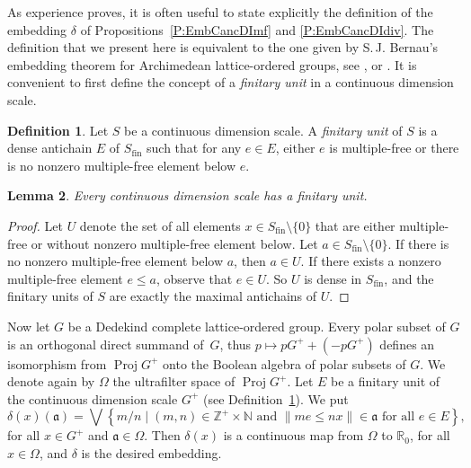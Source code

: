 \documentclass[psamsfonts,reqno]{memo-l}
\theoremstyle{plain}
\newtheorem{lemma}{Lemma}[section]
\theoremstyle{definition}
\newtheorem{definition}[lemma]{Definition}
\theoremstyle{remark}
\numberwithin{equation}{section}
\newcommand{\fa}{\mathfrak{a}}
\newcommand{\fin}{\mathrm{fin}}
\newcommand{\bv}[1]{\left\|#1\right\|}
\newcommand{\NN}{\mathbb{N}}
\newcommand{\ZZ}{\mathbb{Z}}
\newcommand{\RR}{\mathbb{R}}
\DeclareMathOperator{\BB}{Proj}
\newcommand{\set}[1]{\{#1\}}
\newcommand{\Set}[1]{\left\{#1\right\}}
\newcommand{\Setm}[2]{\Set{#1\mid#2}}
\begin{document}
As experience proves, it is often useful to state explicitly the definition
of the embedding $\delta$ of Propositions~\ref{P:EmbCancDImf} and
\ref{P:EmbCancDIdiv}. The definition that we present here is equivalent to
the one given by S.\,J. Bernau's embedding theorem for Archimedean
lattice-ordered groups, see \cite{Bern65}, or
%
\cite[Theorem~2.4]{AnFe88}. It is convenient to first define the concept of a
\emph{finitary unit} in a continuous dimension scale.

\begin{definition}\label{D:FinUn}
Let $S$ be a continuous dimension scale. A \emph{finitary
unit}
of $S$ is a dense
antichain $E$ of $S_\fin$ such that for any $e\in E$, either $e$ is 
multiple-free or there is
no nonzero multiple-free element below $e$.
\end{definition}

\begin{lemma}\label{L:Basis}
Every continuous dimension scale has a finitary unit.
\end{lemma}

\begin{proof}
Let $U$ denote the set of all elements $x\in S_\fin\setminus\set{0}$ that
are either multiple-free or without nonzero multiple-free element below. Let
$a\in S_\fin\setminus\set{0}$. If there is no nonzero
multiple-free element below $a$, then $a\in U$. If there exists a nonzero
multiple-free element $e\leq a$, observe that $e\in U$. So $U$ is
dense in $S_\fin$, and the finitary units of $S$ are exactly
the maximal antichains of $U$.
\end{proof}

Now let $G$ be a Dedekind complete lattice-ordered group. Every polar
subset of $G$ is an orthogonal direct summand of~$G$, thus
$p\mapsto pG^++(-pG^+)$ defines an isomorphism from
$\BB{G^+}$\index{pzzroj@$\BB{S}$} onto the Boolean algebra
 of polar subsets of $G$. We denote
again by $\Omega$ the ultrafilter space of
\index{pzzroj@$\BB{S}$} $\BB G^+$. Let $E$ be a finitary
unit of the continuous dimension scale $G^+$ (see
Definition~\ref{D:FinUn}). We put
   \begin{equation}\label{Eq:Defdelta}
   \delta(x)(\fa)=\bigvee\Setm{m/n}{(m,n)\in\ZZ^+\times\NN\text{ and }
   \bv{me\leq nx}\in\fa\text{ for all }e\in E},
   \end{equation}
\index{dzzelta(x)@$\delta(x)(\fa)$|ii}
for all $x\in G^+$ and $\fa\in\Omega$. Then $\delta(x)$ is a continuous map
from $\Omega$ to $\RR_0$, for all $x\in\Omega$, and $\delta$ is the desired
embedding.
\end{document}
